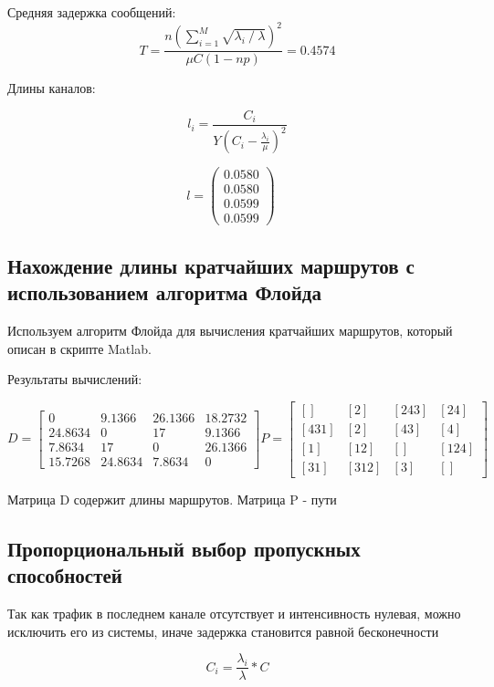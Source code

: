 \documentclass[14pt,a4paper,report]{report}
\begin{document}
Средняя задержка сообщений:
$$ T = \frac{n(\sum_{i=1}^M \sqrt{\lambda_i⁄\lambda}  )^2 }{\mu C(1-np)} = 0.4574  $$


Длины каналов:

$$ l_i = \frac{C_i}{Y(C_i- \frac{\lambda_i}{\mu})^2} $$


$$l =
\begin{pmatrix}
0.0580 \\
0.0580 \\
0.0599 \\
0.0599
\end{pmatrix}
\quad
$$ 

\subsection{Нахождение длины кратчайших маршрутов с использованием алгоритма Флойда}

Используем алгоритм Флойда для вычисления кратчайших маршрутов, который описан в скрипте Matlab. 

Результаты вычислений:

$$ D = \begin{bmatrix}  
0 & 9.1366 & 26.1366 & 18.2732 \\
24.8634 & 0 & 17 & 9.1366 \\
7.8634 & 17 & 0 & 26.1366 \\
15.7268 & 24.8634 & 7.8634 & 0 
\end{bmatrix}
P=\begin{bmatrix} 
[     ] & [2    ] & [2 4 3] & [2 4  ] \\
[4 3 1] & [2    ] & [4 3  ] & [4    ] \\
[1    ] & [1 2  ] & [     ] & [1 2 4] \\
[3 1  ] & [3 1 2] & [3    ] & [     ] \end{bmatrix}$$

Матрица D содержит длины маршрутов. Матрица P - пути


\subsection{Пропорциональный выбор пропускных способностей}

Так как трафик в последнем канале отсутствует и интенсивность нулевая, можно исключить его из системы, иначе задержка становится равной бесконечности




$$ C_i = \frac{\lambda_i}{\lambda}*C $$
\end{document}
